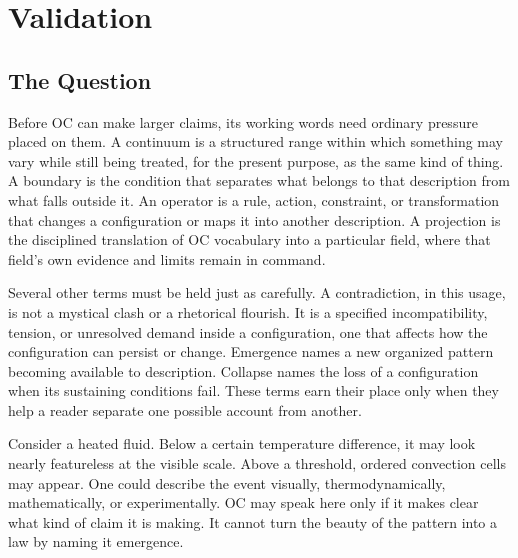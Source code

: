 \documentclass[11pt,a4paper,openany]{book}
\begin{document}
\section{Validation}
\subsection{The Question}
Before OC can make larger claims, its working words need ordinary pressure placed on them. A continuum is a structured range within which something may vary while still being treated, for the present purpose, as the same kind of thing. A boundary is the condition that separates what belongs to that description from what falls outside it. An operator is a rule, action, constraint, or transformation that changes a configuration or maps it into another description. A projection is the disciplined translation of OC vocabulary into a particular field, where that field's own evidence and limits remain in command. \cite{prigogine_dissipative,haken_synergetics}\par
Several other terms must be held just as carefully. A contradiction, in this usage, is not a mystical clash or a rhetorical flourish. It is a specified incompatibility, tension, or unresolved demand inside a configuration, one that affects how the configuration can persist or change. Emergence names a new organized pattern becoming available to description. Collapse names the loss of a configuration when its sustaining conditions fail. These terms earn their place only when they help a reader separate one possible account from another.\par
Consider a heated fluid. Below a certain temperature difference, it may look nearly featureless at the visible scale. Above a threshold, ordered convection cells may appear. One could describe the event visually, thermodynamically, mathematically, or experimentally. OC may speak here only if it makes clear what kind of claim it is making. It cannot turn the beauty of the pattern into a law by naming it emergence.\par
\end{document}
